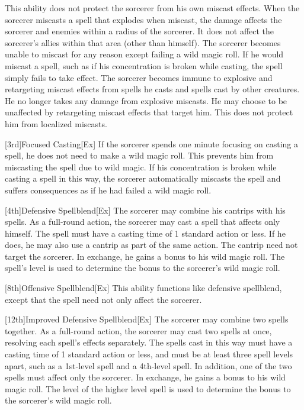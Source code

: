 This ability does not protect the sorcerer from his own miscast effects.
When the sorcerer miscasts a spell that explodes when miscast, the damage affects the sorcerer and enemies within a \areasmall radius of the sorcerer.
It does not affect the sorcerer's allies within that area (other than himself).
The sorcerer becomes unable to miscast for any reason except failing a wild magic roll.
If he would miscast a spell, such as if his concentration is broken while casting, the spell simply fails to take effect.
The sorcerer becomes immune to explosive and retargeting miscast effects from spells he casts and spells cast by other creatures.
He no longer takes any damage from explosive miscasts.
He may choose to be unaffected by retargeting miscast effects that target him.
This does not protect him from localized miscasts.

[3rd]{Focused Casting}[Ex]
If the sorcerer spends one minute focusing on casting a spell, he does not need to make a wild magic roll.
This prevents him from miscasting the spell due to wild magic.
If his concentration is broken while casting a spell in this way, the sorcerer automatically miscasts the spell and suffers consequences as if he had failed a wild magic roll.

[4th]{Defensive Spellblend}[Ex]
The sorcerer may combine his cantrips with his spells.
As a full-round action, the sorcerer may cast a spell that affects only himself.
The spell must have a casting time of 1 standard action or less.
If he does, he may also use a cantrip as part of the same action.
The cantrip need not target the sorcerer.
In exchange, he gains a  bonus to his wild magic roll.
The spell's level is used to determine the bonus to the sorcerer's wild magic roll.

[8th]{Offensive Spellblend}[Ex]
This ability functions like defensive spellblend, except that the spell need not only affect the sorcerer.

[12th]{Improved Defensive Spellblend}[Ex]
The sorcerer may combine two spells together.
As a full-round action, the sorcerer may cast two spells at once, resolving each spell's effects separately.
The spells cast in this way must have a casting time of 1 standard action or less, and must be at least three spell levels apart, such as a 1st-level spell and a 4th-level spell.
In addition, one of the two spells must affect only the sorcerer.
In exchange, he gains a  bonus to his wild magic roll.
The level of the higher level spell is used to determine the bonus to the sorcerer's wild magic roll.

